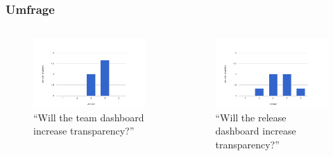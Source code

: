 \documentclass{beamer}
\begin{document}
\begin{frame}
\frametitle{Umfrage}
\begin{columns}
   \begin{figure}[h!]
    \centering
    \includegraphics[scale=0.3,keepaspectratio=true]{./halo2a.png}
    \caption{``Will the team dashboard increase transparency?''}
   \end{figure}
   \begin{figure}[h!]
    \centering
    \includegraphics[scale=0.3,keepaspectratio=true]{./halo2d.png}
    \caption{``Will the release dashboard increase transparency?''}
   \end{figure}
\end{columns}
\end{frame}
\end{document}
